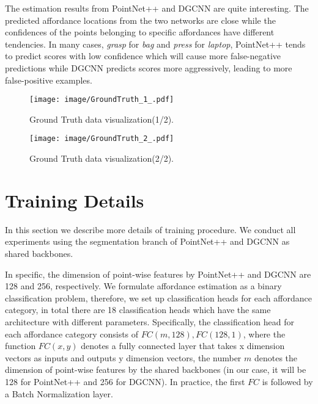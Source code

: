 \documentclass[final]{cvpr}
\begin{document}
The estimation results from PointNet++ and DGCNN are quite interesting. The predicted affordance locations from the two networks are close while the confidences of the points belonging to specific affordances have different tendencies. In many cases, \eg \textit{grasp} for \textit{bag} and \textit{press} for \textit{laptop}, PointNet++ tends to predict scores with low confidence which will cause more false-negative predictions while DGCNN predicts scores more aggressively, leading to more false-positive examples. 

\begin{figure*}[t]
   \begin{center}
      \texttt{[image: image/GroundTruth\_1\_.pdf]}
   \end{center}
   \caption{Ground Truth data visualization(1/2).}
   \label{ground truth 1}
\end{figure*}

\begin{figure*}[t]
   \begin{center}
      \texttt{[image: image/GroundTruth\_2\_.pdf]}
   \end{center}
   \caption{Ground Truth data visualization(2/2).}
   \label{ground truth 2}
\end{figure*}

\section{Training Details} \label{training details}

In this section we describe more details of training procedure. We conduct all experiments using the segmentation branch of PointNet++ and DGCNN as shared backbones. 

In specific, the dimension of point-wise features by PointNet++ and DGCNN are 128 and 256, respectively. We formulate affordance estimation as a binary classification problem, therefore, we set up classification heads for each affordance category, in total there are 18 classification heads which have the same architecture with different parameters. Specifically, the classification head for each affordance category consists of ${FC(m,128),FC(128,1)}$, where the function $FC(x,y)$ denotes a fully connected layer that takes x dimension vectors as inputs and outputs y dimension vectors, the number $m$ denotes the dimension of point-wise features by the shared backbones (in our case, it will be 128 for PointNet++ and 256 for DGCNN). In practice, the first $FC$ is followed by a Batch Normalization layer.
\end{document}
